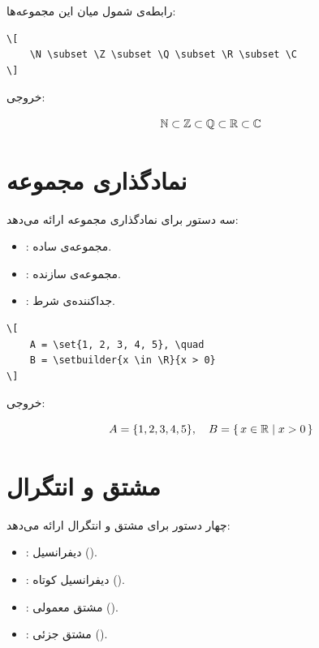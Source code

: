 رابطه‌ی شمول میان این مجموعه‌ها:

\begin{latin}
\begin{verbatim}
\[
    \N \subset \Z \subset \Q \subset \R \subset \C
\]
\end{verbatim}
\end{latin}

خروجی:

\[
    \mathbb{N} \subset \mathbb{Z} \subset \mathbb{Q} \subset \mathbb{R} \subset \mathbb{C}
\]


\section{نمادگذاری مجموعه}
\label{sec:math-sets}

 سه دستور برای نمادگذاری مجموعه
ارائه می‌دهد:

\begin{itemize}
    \item {}: مجموعه‌ی ساده.
    \item {}: مجموعه‌ی
    سازنده.
    \item {}: جداکننده‌ی شرط.
\end{itemize}

\begin{latin}
\begin{verbatim}
\[
    A = \set{1, 2, 3, 4, 5}, \quad
    B = \setbuilder{x \in \R}{x > 0}
\]
\end{verbatim}
\end{latin}

خروجی:

\[
    A = \{1, 2, 3, 4, 5\}, \quad
    B = \{\, x \in \mathbb{R} \mid x > 0 \,\}
\]


\section{مشتق و انتگرال}
\label{sec:math-derivatives}

 چهار دستور برای مشتق و انتگرال
ارائه می‌دهد:

\begin{itemize}
    \item {}: دیفرانسیل ().
    \item {}: دیفرانسیل کوتاه (\lr{$\D$}).
    \item {}: مشتق معمولی
    ().
    \item {}: مشتق جزئی
    ().
\end{itemize}

